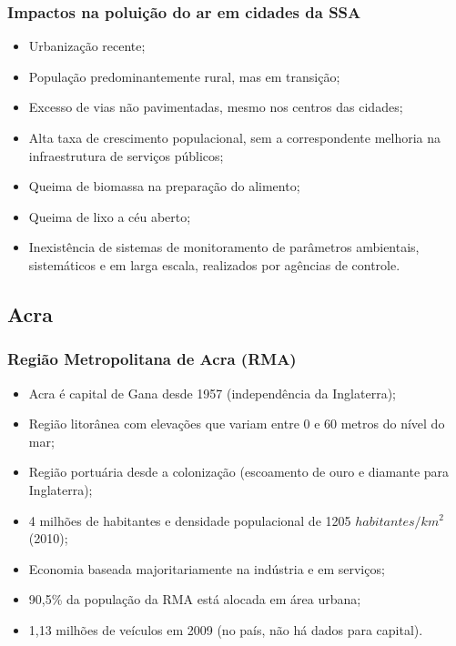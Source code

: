 
\begin{frame}
  \frametitle{Impactos na poluição do ar em cidades da SSA}
  \begin{itemize}
    \item Urbanização recente;
    \item População predominantemente rural, mas em transição;
    \item Excesso de vias não pavimentadas, mesmo nos centros das cidades;
    \item Alta taxa de crescimento populacional, sem a correspondente melhoria 
          na infraestrutura de serviços públicos;
    \item Queima de biomassa na preparação do alimento;  
    \item Queima de lixo a céu aberto;
    \item Inexistência de sistemas de monitoramento de parâmetros ambientais, sistemáticos e em larga escala,
        realizados por agências de controle.
  \end{itemize}
\end{frame}

\subsection{Acra}
\begin{frame}
	\frametitle{Região Metropolitana de Acra (RMA)}
	  \begin{itemize}
	  	\item Acra é capital de Gana desde 1957 (independência da Inglaterra);
	  	\item Região litorânea com elevações que variam entre 0 e 60 metros do nível do mar;
	  	\item Região portuária desde a colonização (escoamento de ouro e diamante para Inglaterra);
	  	\item 4 milhões de habitantes e densidade populacional de 1205 $habitantes/km^2$ (2010);
	  	\item Economia baseada majoritariamente na indústria e em serviços;
	  	\item 90,5\% da população da RMA está alocada em área urbana;
	  	\item 1,13 milhões de veículos em 2009 (no país, não há dados para capital).   	
	  \end{itemize}
\end{frame}

